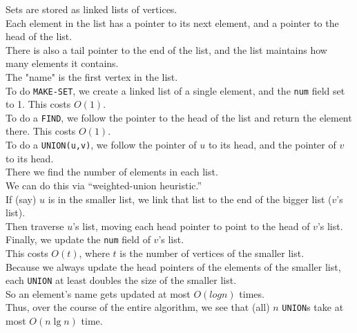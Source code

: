 \documentclass[12pt]{article}
\theoremstyle{plain}
\theoremstyle{definition}
\begin{document}
Sets are stored as linked lists of vertices. \\
Each element in the list has a pointer to its next element, and a pointer to the head of the list. \\
There is also a tail pointer to the end of the list, and the list maintains how many elements it contains. \\
The "name" is the first vertex in the list. \\

To do \texttt{MAKE-SET}, we create a linked list of a single element, and the \texttt{num} field set to 1.
This costs $O(1)$. \\

To do a \texttt{FIND}, we follow the pointer to the head of the list and return the element there.
This costs $O(1)$. \\

To do a \texttt{UNION(u,v)}, we follow the pointer of $u$ to its head, and the pointer of $v$ to its head. \\
There we find the number of elements in each list. \\
We can do this via ``weighted-union heuristic.'' \\
If (say) $u$ is in the smaller list, we link that list to the end of the bigger list ($v$'s list). \\
Then traverse $u$'s list, moving each head pointer to point to the head of $v$'s list. \\
Finally, we update the \texttt{num} field of $v$'s list. \\
This costs $O(t)$, where $t$ is the number of vertices of the smaller list. \\

Because we always update the head pointers of the elements of the smaller list, each \texttt{UNION} at least doubles the size of the smaller list. \\
So an element's name gets updated at most $O(log n)$ times. \\
Thus, over the course of the entire algorithm, we see that (all) $n$ \texttt{UNION}s take at most $O(n\lg{n})$ time.
\end{document}
